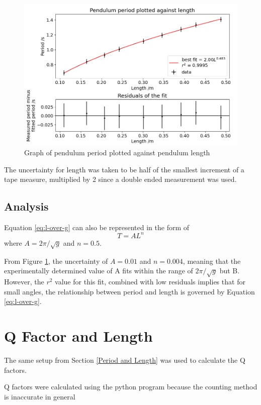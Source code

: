 \documentclass[12pt]{article}
\begin{document}
{\begin{figure}[!hptb]
    \centering
    \includegraphics[width=\textwidth]{../figures/period_vs_length.png}
    \caption{Graph of pendulum period plotted against pendulum length}
    \label{fig:figure 6}
\end{figure}

The uncertainty for length was taken to be half of the smallest increment of a tape measure, multiplied by 2 since a double ended measurement was used.


\subsection{Analysis}
Equation \ref{eq:l-over-g} can also be represented in the form of
\begin{equation}
    T = AL^{n}
\end{equation}
where $A = 2\pi/\sqrt{g}$ and $n = 0.5$.

From Figure \ref{fig:figure 6}, the uncertainty of $A = 0.01$ and $n = 0.004$, meaning that the experimentally determined value of A fits within the range of $2\pi/\sqrt{g}$ but B. However, the $r^2$ value for this fit, combined with low residuals implies that for small angles, the relationship between period and length is governed by Equation \ref{eq:l-over-g}.

\section{Q Factor and Length}
The same setup from Section \ref{Period and Length} was used to calculate the Q factors.

Q factors were calculated using the python program because the counting method is inaccurate in general

}
\end{document}
